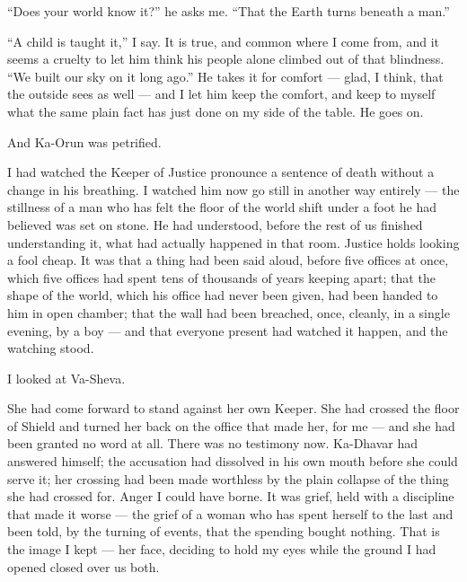 ``Does your world know it?'' he asks me. ``That the Earth turns beneath a man.''\par
 
``A child is taught it,'' I say. It is true, and common where I come from, and it seems a cruelty to let him think his people alone climbed out of that blindness. ``We built our sky on it long ago.'' He takes it for comfort --- glad, I think, that the outside sees as well --- and I let him keep the comfort, and keep to myself what the same plain fact has just done on my side of the table. He goes on.\par
 
\ornament
 
And Ka-Orun was petrified.\par
 
I had watched the Keeper of Justice pronounce a sentence of death without a change in his breathing. I watched him now go still in another way entirely --- the stillness of a man who has felt the floor of the world shift under a foot he had believed was set on stone. He had understood, before the rest of us finished understanding it, what had actually happened in that room. Justice holds looking a fool cheap. It was that a thing had been said aloud, before five offices at once, which five offices had spent tens of thousands of years keeping apart; that the shape of the world, which his office had never been given, had been handed to him in open chamber; that the wall had been breached, once, cleanly, in a single evening, by a boy --- and that everyone present had watched it happen, and the watching stood.\par
 
I looked at Va-Sheva.\par
 
She had come forward to stand against her own Keeper. She had crossed the floor of Shield and turned her back on the office that made her, for me --- and she had been granted no word at all. There was no testimony now. Ka-Dhavar had answered himself; the accusation had dissolved in his own mouth before she could serve it; her crossing had been made worthless by the plain collapse of the thing she had crossed for. Anger I could have borne. It was grief, held with a discipline that made it worse --- the grief of a woman who has spent herself to the last and been told, by the turning of events, that the spending bought nothing. That is the image I kept --- her face, deciding to hold my eyes while the ground I had opened closed over us both.\par
 
